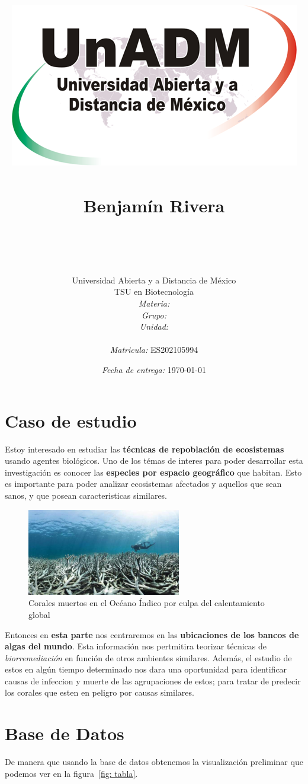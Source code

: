 \documentclass[12pt]{article}
\title{
	\includegraphics{../../../assets/logo-unadm} \\
	\ \\ Benjam\'in Rivera \\
	\bf{\titulo}\\\ \\}
\author{
	Universidad Abierta y a Distancia de México \\
	TSU en Biotecnolog\'ia \\
	\textit{Materia:} \materia \\
	\textit{Grupo:} \grupo \\
	\textit{Unidad:} \unidad \\
	\\
	\textit{Matricula:} ES202105994 }
\date{\textit{Fecha de entrega:} \today}
\begin{document}
\maketitle\newpage


\section{Caso de estudio}


	\par Estoy interesado en estudiar las \textbf{t\'ecnicas de repoblaci\'on de ecosistemas} usando agentes biol\'ogicos. Uno de los t\'emas de interes para poder desarrollar esta investigaci\'on es conocer las \textbf{especies por espacio geogr\'afico} que habitan. Esto es importante para poder analizar ecosistemas afectados y aquellos que sean sanos, y que posean caracteristicas similares. 

	\begin{figure}[h]
		\centering
			\includegraphics[width=0.6\textwidth]{coral-muerto.jpg}
		\caption{Corales muertos en el Océano Índico por culpa del calentamiento global \cite{corales muertos}}
		\label{fig: corales muertos}
	\end{figure}
	

	\par Entonces en \textbf{esta parte} nos centraremos en las \textbf{ubicaciones de los bancos de algas del mundo}. Esta informaci\'on nos pertmitira teorizar t\'ecnicas de \textit{biorremediaci\'on} en funci\'on de otros ambientes similares. Adem\'as, el estudio de estos en alg\'un tiempo determinado nos dara una oportunidad para identificar causas de infeccion y muerte de las agrupaciones de estos; para tratar de predecir los corales que esten en peligro por causas similares.
	
\section{Base de Datos}

	\par De manera que usando la base de datos \cite{db} obtenemos la visualización preliminar que podemos ver en la figura~\ref{fig: tabla}.
	
\end{document}
